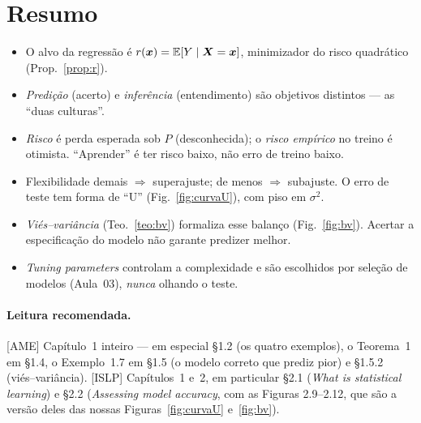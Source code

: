 \documentclass[11pt,a4paper]{article}
\begin{document}
\section*{Resumo}
\begin{itemize}[leftmargin=1.4cm]
  \item O alvo da regressão é $r(\bm{x})=\mathbb{E}[Y\mid\bm{X}=\bm{x}]$, minimizador do risco
        quadrático (Prop.~\ref{prop:r}).
  \item \emph{Predição} (acerto) e \emph{inferência} (entendimento) são objetivos
        distintos --- as ``duas culturas''.
  \item \emph{Risco} é perda esperada sob $P$ (desconhecida); o \emph{risco
        empírico} no treino é otimista. ``Aprender'' é ter risco baixo, não erro de
        treino baixo.
  \item Flexibilidade demais $\Rightarrow$ superajuste; de menos $\Rightarrow$
        subajuste. O erro de teste tem forma de ``U'' (Fig.~\ref{fig:curvaU}), com
        piso em $\sigma^2$.
  \item \emph{Viés--variância} (Teo.~\ref{teo:bv}) formaliza esse balanço
        (Fig.~\ref{fig:bv}). Acertar a especificação do modelo não garante predizer
        melhor.
  \item \emph{Tuning parameters} controlam a complexidade e são escolhidos por
        seleção de modelos (Aula~03), \emph{nunca} olhando o teste.
\end{itemize}

\paragraph{Leitura recomendada.} [AME] Capítulo~1 inteiro --- em especial §1.2 (os
quatro exemplos), o Teorema~1 em §1.4, o Exemplo~1.7 em §1.5 (o modelo correto que
prediz pior) e §1.5.2 (viés--variância). [ISLP] Capítulos~1 e~2, em particular
§2.1 (\emph{What is statistical learning}) e §2.2 (\emph{Assessing model accuracy},
com as Figuras 2.9--2.12, que são a versão deles das nossas
Figuras~\ref{fig:curvaU} e~\ref{fig:bv}).
\end{document}
